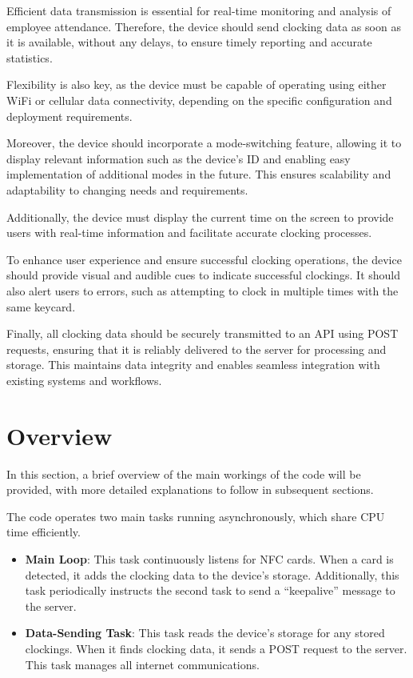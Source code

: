 Efficient data transmission is essential for real-time monitoring and analysis of employee 
attendance. Therefore, the device should send clocking data as soon as it is available, without any 
delays, to ensure timely reporting and accurate statistics.

Flexibility is also key, as the device must be capable of operating using either WiFi or cellular 
data connectivity, depending on the specific configuration and deployment requirements.

Moreover, the device should incorporate a mode-switching feature, allowing it to display relevant 
information such as the device's ID and enabling easy implementation of additional modes in the 
future. This ensures scalability and adaptability to changing needs and requirements.

Additionally, the device must display the current time on the screen to provide users with 
real-time information and facilitate accurate clocking processes.

To enhance user experience and ensure successful clocking operations, the device should provide 
visual and audible cues to indicate successful clockings. It should also alert users to errors, 
such as attempting to clock in multiple times with the same keycard.

Finally, all clocking data should be securely transmitted to an API using POST requests, ensuring 
that it is reliably delivered to the server for processing and storage. This maintains data 
integrity and enables seamless integration with existing systems and workflows.



%
%

\section{Overview}

In this section, a brief overview of the main workings of the code will be provided, with more 
detailed explanations to follow in subsequent sections.

The code operates two main tasks running asynchronously, which share CPU time efficiently.

\begin{itemize}
	\item \textbf{Main Loop}: This task continuously listens for NFC cards. When a card is 
	detected, it adds the clocking data to the device's storage. Additionally, this task 
	periodically instructs the second task to send a ``keepalive'' message to the server.
	\item \textbf{Data-Sending Task}: This task reads the device's storage for any stored 
	clockings. When it finds clocking data, it sends a POST request to the server. This task 
	manages all internet communications.
\end{itemize}

